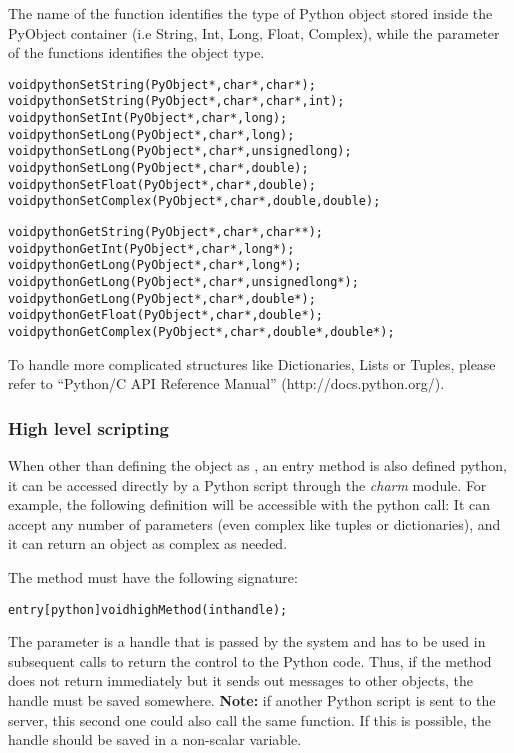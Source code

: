 The name of the function identifies the type of Python object stored inside the
PyObject container (i.e String, Int, Long, Float, Complex), while the parameter
of the functions identifies the \CC object type.

\begin{alltt}
void pythonSetString(PyObject*, char*, char*);
void pythonSetString(PyObject*, char*, char*, int);
void pythonSetInt(PyObject*, char*, long);
void pythonSetLong(PyObject*, char*, long);
void pythonSetLong(PyObject*, char*, unsigned long);
void pythonSetLong(PyObject*, char*, double);
void pythonSetFloat(PyObject*, char*, double);
void pythonSetComplex(PyObject*, char*, double, double);

void pythonGetString(PyObject*, char*, char**);
void pythonGetInt(PyObject*, char*, long*);
void pythonGetLong(PyObject*, char*, long*);
void pythonGetLong(PyObject*, char*, unsigned long*);
void pythonGetLong(PyObject*, char*, double*);
void pythonGetFloat(PyObject*, char*, double*);
void pythonGetComplex(PyObject*, char*, double*, double*);
\end{alltt}

To handle more complicated structures like Dictionaries, Lists or Tuples, please refer to ``Python/C API Reference Manual'' (http://docs.python.org/).

\subsubsection{High level scripting}

\label{pythonHighLevel}

When other than defining the \charmpp{} object as , an entry method
is also defined python, it can be accessed directly by a Python script through the
{\em charm} module. For example, the following definition will be accessible
with the python call:
It can accept any number of parameters (even complex like tuples or
dictionaries), and it can return an object as complex as needed.

The method must have the following signature:

\begin{alltt}
entry [python] void highMethod(int handle);
\end{alltt}

The parameter is a handle that is passed by the system and has to be used in
subsequent calls to return the control to the Python code. Thus, if the method
does not return immediately but it sends out messages to other \charmpp{}
objects, the handle must be saved somewhere. \textbf{Note:} if another Python
script is sent to the server, this second one could also call the same function.
If this is possible, the handle should be saved in a non-scalar variable.

